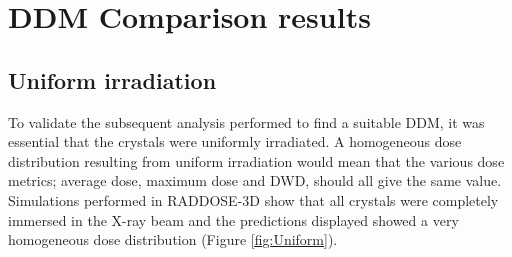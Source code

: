 \section{DDM Comparison results}
\label{sec:DDM Comparison results}

\subsection{Uniform irradiation}
\label{sub:Uniform irradiation}

To validate the subsequent analysis performed to find a suitable DDM, it was essential that the crystals were uniformly irradiated.
A homogeneous dose distribution resulting from uniform irradiation would mean that the various dose metrics; average dose, maximum dose and DWD, should all give the same value.
Simulations performed in RADDOSE-3D show that all crystals were completely immersed in the X-ray beam and the predictions displayed showed a very homogeneous dose distribution (Figure \ref{fig:Uniform}).

